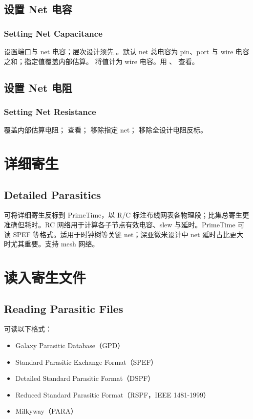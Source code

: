 \subsection{设置 Net 电容}
\subsubsection*{Setting Net Capacitance}

 设置端口与 net 电容；层次设计须先 。默认 net 总电容为 pin、port 与 wire 电容之和；指定值覆盖内部估算。 将值计为 wire 电容。用 、 查看。

\subsection{设置 Net 电阻}
\subsubsection*{Setting Net Resistance}

 覆盖内部估算电阻； 查看； 移除指定 net； 移除全设计电阻反标。

\section{详细寄生}
\subsection*{Detailed Parasitics}

可将详细寄生反标到 PrimeTime，以 R/C 标注布线网表各物理段；比集总寄生更准确但耗时。RC 网络用于计算各子节点有效电容、slew 与延时。PrimeTime 可读 SPEF 等格式。适用于时钟树等关键 net；深亚微米设计中 net 延时占比更大时尤其重要。支持 mesh 网络。

\section{读入寄生文件}
\subsection*{Reading Parasitic Files}

 可读以下格式：\begin{itemize}
  \item Galaxy Parasitic Database（GPD）
  \item Standard Parasitic Exchange Format（SPEF）
  \item Detailed Standard Parasitic Format（DSPF）
  \item Reduced Standard Parasitic Format（RSPF，IEEE 1481-1999）
  \item Milkyway（PARA）
\end{itemize}

